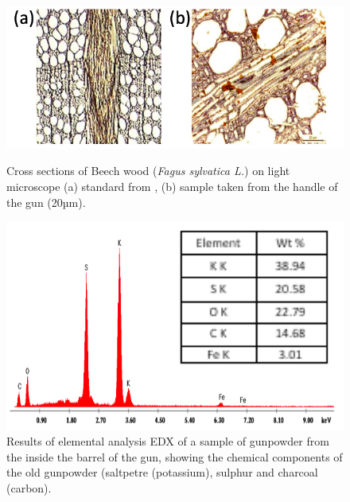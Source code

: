 \begin{figure}[!htb]
	\begin{minipage}[b]{0.55\linewidth}
		\centering
		\includegraphics[width=.9\linewidth]{figures/zidan_Fig8}
		\caption{Cross sections of Beech wood (\textit{Fagus sylvatica L.}) on light microscope (a) standard from \textcite{Richter_2000}, (b) sample taken from the handle of the gun (20µm).}
		\label{fig:Fig8}
	\end{minipage} 
	\begin{minipage}[b]{0.45\linewidth}
		\centering
		\includegraphics[width=.95\linewidth]{figures/zidan_Fig9}
		\caption{Results of elemental analysis EDX of a sample of gunpowder from the inside the barrel of the gun, showing the chemical components of the old gunpowder (saltpetre (potassium), sulphur and charcoal (carbon).}
		\label{fig:Fig9}
	\end{minipage} 
\end{figure}

